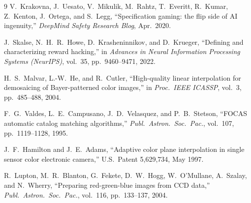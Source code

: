 \documentclass[10pt,twocolumn,letterpaper]{article}
\begin{document}
\begin{enumerate}
\end{enumerate}

\begin{thebibliography}{9}
  \footnotesize
  V.~Krakovna, J.~Uesato, V.~Mikulik, M.~Rahtz, T.~Everitt, R.~Kumar, Z.~Kenton, J.~Ortega, and S.~Legg,
  ``Specification gaming: the flip side of AI ingenuity,''
  \emph{DeepMind Safety Research Blog}, Apr.\ 2020.

  J.~Skalse, N.~H.~R.~Howe, D.~Krasheninnikov, and D.~Krueger,
  ``Defining and characterizing reward hacking,''
  in \emph{Advances in Neural Information Processing Systems (NeurIPS)}, vol.~35, pp.~9460--9471, 2022.

  H.~S.~Malvar, L.-W.~He, and R.~Cutler,
  ``High-quality linear interpolation for demosaicing of Bayer-patterned color images,''
  in \emph{Proc.\ IEEE ICASSP}, vol.~3, pp.~485--488, 2004.

  F.~G.~Valdes, L.~E.~Campusano, J.~D.~Velasquez, and P.~B.~Stetson,
  ``FOCAS automatic catalog matching algorithms,''
  \emph{Publ.\ Astron.\ Soc.\ Pac.}, vol.~107, pp.~1119--1128, 1995.

  J.~F.~Hamilton and J.~E.~Adams,
  ``Adaptive color plane interpolation in single sensor color electronic camera,''
  U.S.\ Patent 5,629,734, May 1997.

  R.~Lupton, M.~R.~Blanton, G.~Fekete, D.~W.~Hogg, W.~O'Mullane, A.~Szalay, and N.~Wherry,
  ``Preparing red-green-blue images from CCD data,''
  \emph{Publ.\ Astron.\ Soc.\ Pac.}, vol.~116, pp.~133--137, 2004.
\end{thebibliography}
\end{document}
